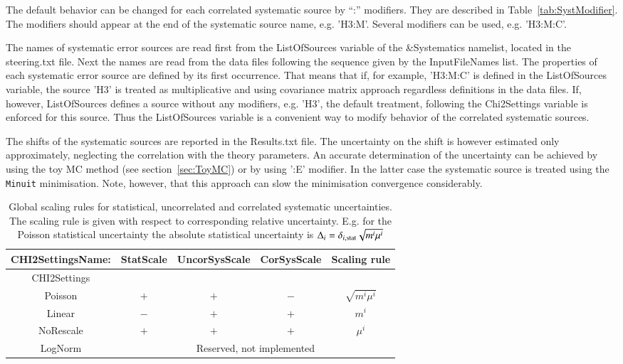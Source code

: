 The default behavior can be changed for each correlated systematic source by ``:'' modifiers.
They are described in Table~\ref{tab:SystModifier}. The modifiers should appear at the end 
of the systematic source name, e.g. {\sc 'H3:M'}. Several modifiers can be used, e.g. {\sc 'H3:M:C'}.

The names of systematic error sources are read first from the {\sc ListOfSources} variable of the 
{\sc \&Systematics} namelist, located in the {\sc steering.txt} file. Next the names are read from the
data files following the sequence given by the {\sc InputFileNames} list. The properties of each systematic
error source are defined by its first occurrence. That means that if, for example, {\sc 'H3:M:C'} is defined
in the {\sc ListOfSources} variable, the source {\sc 'H3'} is treated as multiplicative and using covariance
matrix approach regardless definitions in the data files. If, however, {\sc ListOfSources} defines a source
without any modifiers, e.g. {\sc 'H3'}, the default treatment, following the {\sc Chi2Settings} variable is
enforced for this source.
Thus the {\sc ListOfSources } variable is a convenient way to modify behavior of the correlated systematic
sources.

The shifts of the systematic sources are reported in the {\sc Results.txt} file. The uncertainty on the shift
is however estimated only approximately, neglecting the correlation with the theory parameters. An accurate determination
of the uncertainty can be achieved by using the toy MC method (see section~\ref{sec:ToyMC}) or by using {\sc ':E'} 
modifier. In the latter case the systematic source is treated using the {\tt Minuit} minimisation. Note, however,
that this approach can slow the minimisation convergence considerably.
\begin{table}
\begin{center}
\begin{tabular}{ccccc} 
\hline
{\sc CHI2SettingsName:}   & {\sc StatScale} & {\sc UncorSysScale} & {\sc CorSysScale} & Scaling rule \\
\hline
{\sc CHI2Settings}       &                 &                     &                   &              \\
\hline
  {\sc Poisson}   &  $+$  &  $+$  &  $-$  & $\sqrt{ m^i \mu^i}$ \\
  {\sc Linear}    & $-$   &  $+$  &  $+$  & $m^i$               \\
  {\sc NoRescale} & $+$   &  $+$  &  $+$  & $\mu^i$   \\
  {\sc LogNorm}   &  \multicolumn{4}{c}{Reserved, not implemented} \\
\hline
\end{tabular}
\end{center}
\caption{\label{tab:ErrScale}Global scaling rules for statistical, 
uncorrelated and correlated systematic uncertainties. The scaling
rule is given with respect to corresponding relative uncertainty.
E.g. for the {\sc Poisson} statistical uncertainty the absolute statistical
uncertainty is $\Delta_i = \delta_{i, {\rm stat}}\sqrt{m^i\mu^i}$   }
\end{table}

